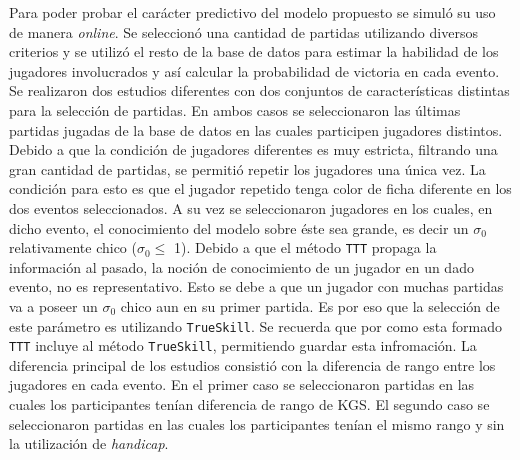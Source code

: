 \documentclass[11pt,twoside, spanish]{report} %
\begin{document}
Para poder probar el car\'acter predictivo del modelo propuesto se simul\'o su uso de manera \textit{online}.
Se seleccion\'o una cantidad de partidas utilizando diversos criterios y se utiliz\'o el resto de la base de datos para estimar la habilidad de los jugadores involucrados y as\'i calcular la probabilidad de victoria en cada evento.
Se realizaron dos estudios diferentes con dos conjuntos de caracter\'isticas distintas para la selecci\'on de  partidas.
En ambos casos se seleccionaron las \'ultimas partidas jugadas de la base de datos en las cuales participen jugadores distintos.
Debido a que la condici\'on de jugadores diferentes es muy estricta, filtrando una gran cantidad de partidas, se permiti\'o repetir los jugadores una \'unica vez.
La condici\'on para esto es que el jugador repetido tenga color de ficha diferente en los dos eventos seleccionados.
A su vez se seleccionaron jugadores en los cuales, en dicho evento, el conocimiento del modelo sobre \'este sea grande, es decir un $\sigma_0$ relativamente chico ($\sigma_0 \leq$ 1).
Debido a que el m\'etodo \texttt{TTT} propaga la informaci\'on al pasado, la noci\'on de conocimiento de un jugador en un dado evento, no es representativo.
Esto se debe a que un jugador con muchas partidas va a poseer un $\sigma_0$ chico aun en su primer partida.
Es por eso que la selecci\'on de este par\'ametro es utilizando \texttt{TrueSkill}.
Se recuerda que por como esta formado \texttt{TTT} incluye al m\'etodo \texttt{TrueSkill}, permitiendo guardar esta infromaci\'on.
La diferencia principal de los estudios consisti\'o con la diferencia de rango entre los jugadores en cada evento.
En el primer caso se seleccionaron partidas en las cuales los participantes ten\'ian diferencia de rango de KGS.
El segundo caso se seleccionaron partidas en las cuales los participantes ten\'ian el mismo rango y sin la utilizaci\'on de \textit{handicap}. 
\end{document}
